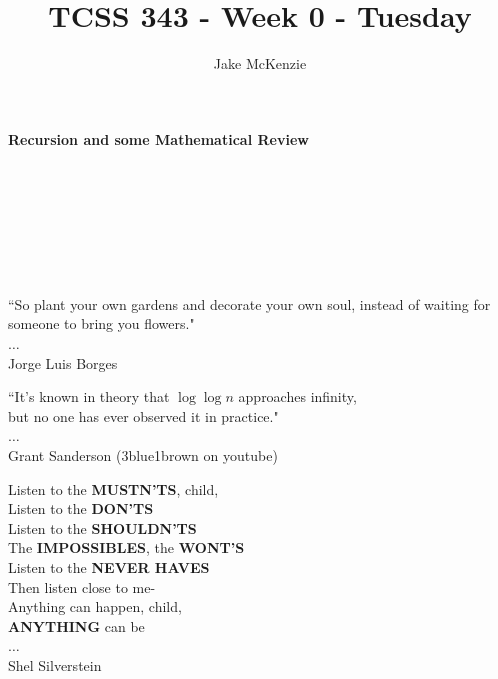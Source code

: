 \documentclass[12pt]{article}
\begin{document}
\title{TCSS 343 - Week 0 - Tuesday}
\author{Jake McKenzie}
\maketitle
\noindent\centerline{\textbf{Recursion and some Mathematical Review}}\\\\\\\\\\\\
\begin{center}
    ``So plant your own gardens and decorate your own soul, instead of waiting for someone to bring you flowers." \\$\dots$\\ Jorge Luis Borges
\end{center}
\begin{center}
    ``It's known in theory that $\log{\log{n}}$ approaches infinity, \\but no one has ever observed it in practice." \\$\dots$\\ Grant Sanderson (3blue1brown on youtube)
\end{center}
\begin{center}
Listen to the \textbf{MUSTN'TS}, child,\\
Listen to the \textbf{DON'TS}\\
Listen to the \textbf{SHOULDN'TS}\\
The \textbf{IMPOSSIBLES}, the \textbf{WONT'S}\\
Listen to the \textbf{NEVER HAVES}\\
Then listen close to me-\\
Anything can happen, child,\\
\textbf{ANYTHING} can be\\ 
$\dots$\\
Shel Silverstein 
\end{center}
\newpage
\end{document}

